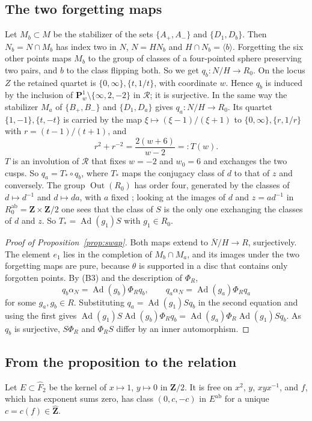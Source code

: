 \documentclass[11pt,a4paper]{article}
\theoremstyle{plain}
\theoremstyle{definition}
\theoremstyle{remark}
\newcommand{\Zh}{\widehat{\mathbf Z}}
\newcommand{\Z}{\mathbf Z}
\newcommand{\Fh}{\widehat F}
\newcommand{\Ad}{\operatorname{Ad}}
\newcommand{\Out}{\operatorname{Out}}
\newcommand{\ab}{\mathrm{ab}}
\begin{document}
\subsection*{The two forgetting maps}
Let $M_b\subset M$ be the stabilizer of the sets $\{A_+,A_-\}$ and $\{D_1,D_b\}$. Then $N_b=N\cap M_b$ has index two
in $N$, $N=HN_b$ and $H\cap N_b=\langle b\rangle$. Forgetting the six other points maps $M_b$ to the group of
classes of a four-pointed sphere preserving two pairs, and $b$ to the class flipping both. So we get
$q_b:N/H\to R_0$. On the locus $Z$ the retained quartet is $\{0,\infty\},\{t,1/t\}$, with coordinate $w$. Hence
$q_b$ is induced by the inclusion of $\mathbf P^1_w\setminus\{\infty,2,-2\}$ in $\mathcal R$; it is surjective.
In the same way the stabilizer $M_a$ of $\{B_+,B_-\}$ and $\{D_1,D_a\}$ gives $q_a:N/H\to R_0$. Its quartet
$\{1,-1\},\{t,-t\}$ is carried by the map $\xi\mapsto(\xi-1)/(\xi+1)$ to $\{0,\infty\},\{r,1/r\}$ with
$r=(t-1)/(t+1)$, and
\[
 r^2+r^{-2}=\frac{2(w+6)}{w-2}=:T(w).
\]
$T$ is an involution of $\mathcal R$ that fixes $w=-2$ and $w_0=6$ and exchanges the two cusps. So
$q_a=T_*\circ q_b$, where $T_*$ maps the conjugacy class of $d$ to that of $z$ and conversely. The group
$\Out(R_0)$ has order four, generated by the classes of $d\mapsto d^{-1}$ and $d\mapsto da$, with $a$ fixed
\cite{FR}; looking at the images of $d$ and $z=ad^{-1}$ in $R_0^{\ab}=\Z\times\Z/2$ one sees that the class of $S$
is the only one exchanging the classes of $d$ and $z$. So $T_*=\Ad(g_1)S$ with $g_1\in R_0$.

\begin{proof}[Proof of Proposition~\ref{prop:swap}]
Both maps extend to $\overline N/H\to R$, surjectively. The element $e_1$ lies in the completion of $M_b\cap M_a$,
and its images under the two forgetting maps are pure, because $\theta$ is supported in a disc that contains only
forgotten points. By (B3) and the description of $\Phi_R$,
\[
 q_b\alpha_N=\Ad(g_b)\Phi_Rq_b,\qquad q_a\alpha_N=\Ad(g_a)\Phi_Rq_a
\]
for some $g_a,g_b\in R$. Substituting $q_a=\Ad(g_1)Sq_b$ in the second equation and using the first gives
$\Ad(g_1)S\Ad(g_b)\Phi_Rq_b=\Ad(g_a)\Phi_R\Ad(g_1)Sq_b$. As $q_b$ is surjective, $S\Phi_R$ and $\Phi_RS$ differ by
an inner automorphism.
\end{proof}

\subsection*{From the proposition to the relation}
Let $E\subset\Fh_2$ be the kernel of $x\mapsto1$, $y\mapsto0$ in $\Z/2$. It is free on $x^2$, $y$, $xyx^{-1}$, and
$f$, which has exponent sums zero, has class $(0,c,-c)$ in $E^{\ab}$ for a unique $c=c(f)\in\Zh$.
\end{document}
